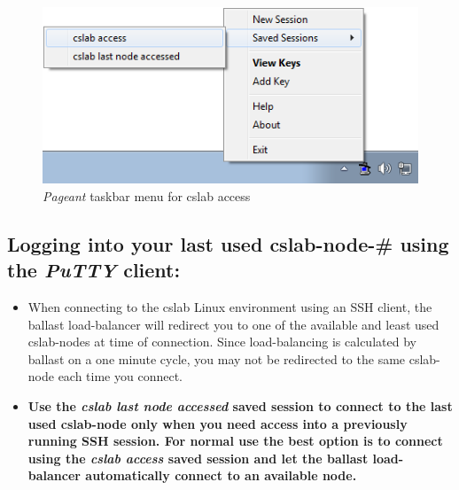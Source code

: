 \documentclass[12pt]{article}
\begin{document}
\begin{flushleft}
\begin{figure}[bh!]
  \centering
  \centering
  \includegraphics[width=.5\linewidth]{pageant_taskbar_menu}
\caption{\textit{Pageant} taskbar menu for cslab access}
  \label{fig:pageant}
\end{figure}

\newpage
\subsection*{Logging into your last used cslab-node-\# using the \textit{PuTTY} client:}
\begin{itemize}
  \item When connecting to the cslab Linux environment using an SSH client, the ballast load-balancer will redirect you to one of the available and least used cslab-nodes at time of connection. Since load-balancing is calculated by ballast on a one minute cycle, you may not be redirected to the same cslab-node each time you connect.

  \item \textbf{Use the \textit{cslab last node accessed} saved session to connect to the last used cslab-node only when you need access into a previously running SSH session. For normal use the best option is to connect using the \textit{cslab access} saved session and let the ballast load-balancer automatically connect to an available node.}
\end{itemize}


\end{flushleft}
\end{document}
